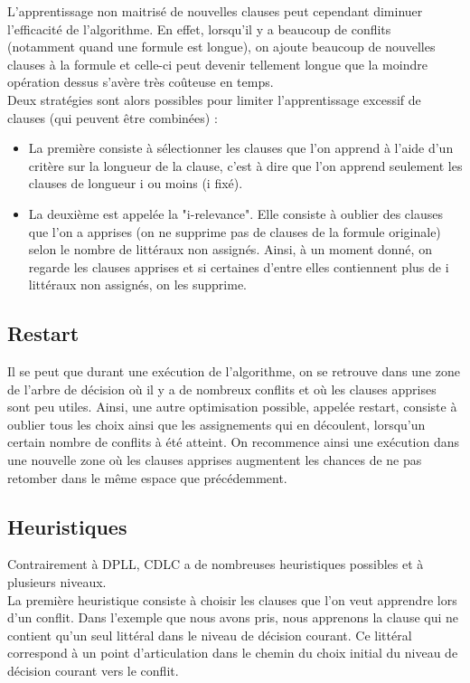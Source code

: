 \documentclass[12pt]{extarticle}
\begin{document}
L'apprentissage non maitrisé de nouvelles clauses peut cependant diminuer l'efficacité de l'algorithme. En effet, lorsqu'il y a beaucoup de conflits (notamment quand une formule est longue), on ajoute beaucoup de nouvelles clauses à la formule et celle-ci peut devenir tellement longue que la moindre opération dessus s'avère très coûteuse en temps. \\
Deux stratégies sont alors possibles pour limiter l'apprentissage excessif de clauses (qui peuvent être combinées) :
\begin{itemize}
    \item La première consiste à sélectionner les clauses que l'on apprend à l'aide d'un critère sur la longueur de la clause, c'est à dire que l'on apprend seulement les clauses de longueur i ou moins (i fixé).
    \item La deuxième est appelée la "i-relevance". Elle consiste à oublier des clauses que l'on a apprises (on ne supprime pas de clauses de la formule originale) selon le nombre de littéraux non assignés. Ainsi, à un moment donné, on regarde les clauses apprises et si certaines d'entre elles contiennent plus de i littéraux non assignés, on les supprime.
\end{itemize}

\subsection{Restart}

Il se peut que durant une exécution de l'algorithme, on se retrouve dans une zone de l'arbre de décision où il y a de nombreux conflits et où les clauses apprises sont peu utiles.  
Ainsi, une autre optimisation possible, appelée restart, consiste à oublier tous les choix ainsi que les assignements qui en découlent, lorsqu'un certain nombre de conflits à été atteint. 
On recommence ainsi une exécution dans une nouvelle zone où les clauses apprises augmentent les chances de ne pas retomber dans le même espace que précédemment.

\subsection{Heuristiques}

Contrairement à DPLL, CDLC a de nombreuses heuristiques possibles et à plusieurs niveaux. \\

La première heuristique consiste à choisir les clauses que l'on veut apprendre lors d'un conflit. Dans l'exemple que nous avons pris, nous apprenons la clause qui ne contient qu'un seul littéral dans le niveau de décision courant. Ce littéral correspond à un point d'articulation dans le chemin du choix initial du niveau de décision courant vers le conflit.
\end{document}

